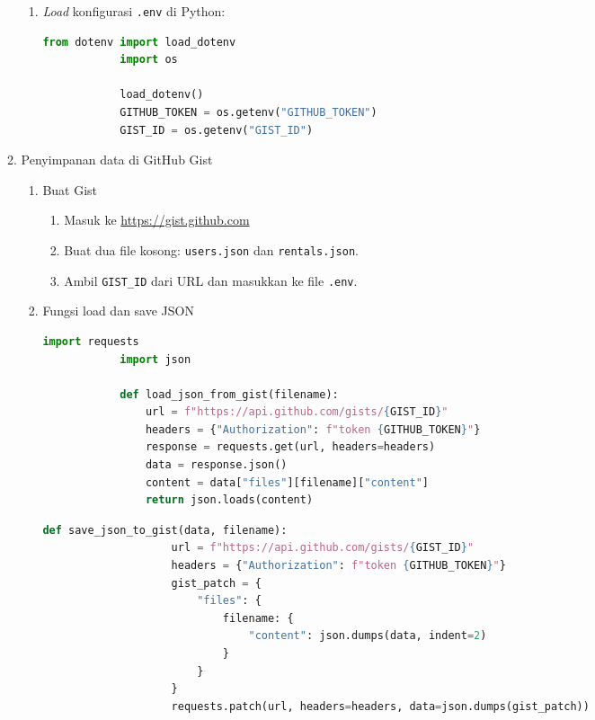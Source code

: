 \begin{enumerate}
\begin{enumerate}
\begin{enumerate}
        \item \textit{Load} konfigurasi \texttt{.env} di Python:
        \begin{lstlisting}[language=Python]
            from dotenv import load_dotenv
            import os
            
            load_dotenv()
            GITHUB_TOKEN = os.getenv("GITHUB_TOKEN")
            GIST_ID = os.getenv("GIST_ID")
        \end{lstlisting}
      \end{enumerate}
      
      \item {Penyimpanan data di GitHub Gist}
      \begin{enumerate}
        \item {Buat Gist}
        \begin{enumerate}
            \item Masuk ke \url{https://gist.github.com}
            \item Buat dua file kosong: \texttt{users.json} dan \texttt{rentals.json}.
            \item Ambil \texttt{GIST\_ID} dari URL dan masukkan ke file \texttt{.env}.
        \end{enumerate}
        
        \item {Fungsi load dan save JSON}
            \begin{lstlisting}[language=Python]
            import requests
            import json
            
            def load_json_from_gist(filename):
                url = f"https://api.github.com/gists/{GIST_ID}"
                headers = {"Authorization": f"token {GITHUB_TOKEN}"}
                response = requests.get(url, headers=headers)
                data = response.json()
                content = data["files"][filename]["content"]
                return json.loads(content)
            \end{lstlisting}
        
            \begin{lstlisting}[language=Python]
                def save_json_to_gist(data, filename):
                    url = f"https://api.github.com/gists/{GIST_ID}"
                    headers = {"Authorization": f"token {GITHUB_TOKEN}"}
                    gist_patch = {
                        "files": {
                            filename: {
                                "content": json.dumps(data, indent=2)
                            }
                        }
                    }
                    requests.patch(url, headers=headers, data=json.dumps(gist_patch))
            \end{lstlisting}
      \end{enumerate}


\end{enumerate}
\end{enumerate}
